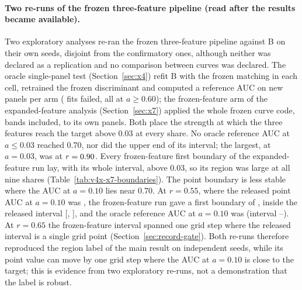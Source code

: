 \paragraph{Two re-runs of the frozen three-feature pipeline (read after the results became available).}
Two exploratory analyses re-ran the frozen three-feature pipeline against B on their own seeds, disjoint from the confirmatory ones, although neither was declared as a replication and no comparison between curves was declared. The oracle single-panel test (Section~\ref{sec:x4}) refit B with the frozen matching in each cell, retrained the frozen discriminant and computed a reference AUC on  new panels per arm ( fits failed, all at $a\ge0.60$); the frozen-feature arm of the expanded-feature analysis (Section~\ref{sec:x7}) applied the whole frozen curve code, bands included, to its own panels. Both place the strength at which the three features reach the target above 0.03 at every share. No oracle reference AUC at $a\le0.03$ reached 0.70, nor did the upper end of its interval; the largest, at $a=0.03$, was  at $r=\resultnum{j.x4a.a0300.auc_ref.max.r}{0.90}$. Every frozen-feature first boundary of the expanded-feature run lay, with its whole interval, above 0.03, so its region was large at all nine shares (Table~\ref{tab:v4x-x7-boundaries}). The point boundary is less stable where the AUC at $a=0.10$ lies near 0.70. At $r=0.55$, where the released point AUC at $a=0.10$ was , the frozen-feature run gave a first boundary of , inside the released interval [, ], and the oracle reference AUC at $a=0.10$ was  (interval --). At $r=0.65$ the frozen-feature interval spanned one grid step where the released interval is a single grid point (Section~\ref{sec:record-gate}). Both re-runs therefore reproduced the region label of the main result on independent seeds, while its point value can move by one grid step where the AUC at $a=0.10$ is close to the target; this is evidence from two exploratory re-runs, not a demonstration that the label is robust.

